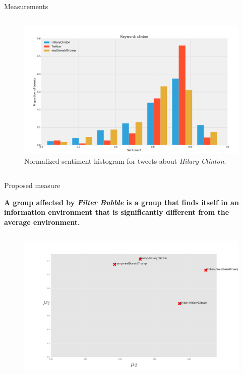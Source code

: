 \documentclass{beamer}
\begin{document}
\begin{frame}[fragile]
\begin{columns}[T]
\begin{column}{.63\textwidth}
\begin{block}{Measurements}
\begin{columns}
\begin{figure}
                \includegraphics[scale=0.5]{./Pics/hist-clinton.png}
                \caption*{Normalized sentiment histogram for tweets about \textit{Hilary Clinton}.}
            \end{figure}
    \end{columns}
\end{block}
\vspace{-2cm}
\begin{block}{Proposed measure}
    \centering
    \begin{large}\textbf{A group affected by \textit{Filter Bubble} is a group that finds itself in an information environment that is significantly different from the average environment.}\end{large}
    \begin{columns}
            \begin{figure}
                \centering
                \captionsetup{justification=centering,margin=1cm}
                \includegraphics[scale=0.55]{./Pics/metric-L2-1Q.png}

\end{figure}
\end{columns}
\end{block}
\end{column}
\end{columns}
\end{frame}
\end{document}
